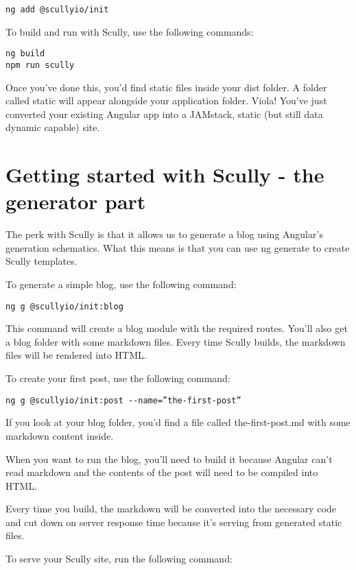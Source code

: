\begin{verbatim}
ng add @scullyio/init
\end{verbatim}

To build and run with Scully, use the following commands:

\begin{verbatim}
ng build
npm run scully
\end{verbatim}

Once you've done this, you'd find static files inside your dist folder. A folder called static will appear alongside your application folder. 
Viola! You've just converted your existing Angular app into a JAMstack, static (but still data dynamic capable) site.

\section{Getting started with Scully - the generator part}
The perk with Scully is that it allows us to generate a blog using Angular's generation schematics. What this means is that you can use ng generate to create Scully templates.

To generate a simple blog, use the following command:

\begin{verbatim}
ng g @scullyio/init:blog
\end{verbatim}

This command will create a blog module with the required routes. You'll also get a blog folder with some markdown files. Every time Scully builds, the markdown files will be rendered into HTML.

To create your first post, use the following command:

\begin{verbatim}
ng g @scullyio/init:post --name=”the-first-post”
\end{verbatim}

If you look at your blog folder, you'd find a file called the-first-post.md with some markdown content inside.

When you want to run the blog, you'll need to build it because Angular can't read markdown and the contents of the post will need to be compiled into HTML.

Every time you build, the markdown will be converted into the necessary code and cut down on server response time because it's serving from generated static files.

To serve your Scully site, run the following command:

